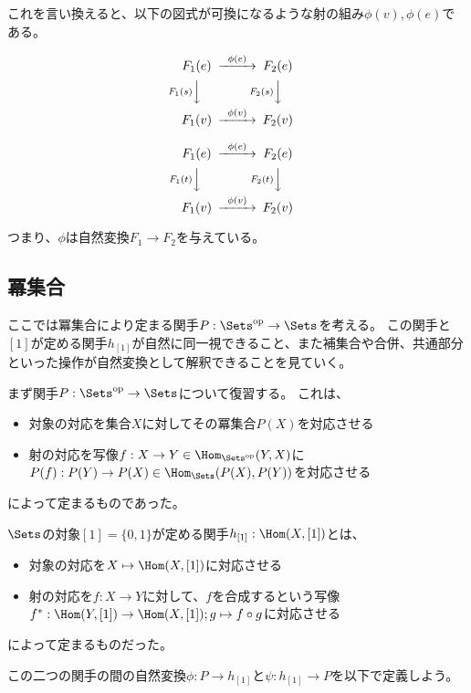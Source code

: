 \documentclass[uplatex]{jsarticle}
\begin{document}
これを言い換えると、以下の図式が可換になるような射の組み$\phi(v), \phi(e)$である。
\begin{multicols}{2}
\begin{align*}
\begin{CD}
F_1(e)@>\phi(e)>>F_2(e)\\
@VF_1(s)VV@VF_2(s)VV\\
F_1(v)@>\phi(v)>>F_2(v)
\end{CD}
\end{align*}

\begin{align*}
\begin{CD}
F_1(e)@>\phi(e)>>F_2(e)\\
@VF_1(t)VV@VF_2(t)VV\\
F_1(v)@>\phi(v)>>F_2(v)
\end{CD}
\end{align*}
\end{multicols}
つまり、$\phi$は自然変換$F_1 \to F_2$を与えている。

\subsection{冪集合}
ここでは冪集合により定まる関手$P:\Sets^{\rm op}\to\Sets$を考える。
この関手と$[1]$が定める関手$h_{[1]}$が自然に同一視できること、また補集合や合併、共通部分といった操作が自然変換として解釈できることを見ていく。

\vspace{10pt}

まず関手$P:\Sets^{\rm op}\to\Sets$について復習する。
これは、
\begin{itemize}
\item 対象の対応を集合$X$に対してその冪集合$P(X)$を対応させる
\item 射の対応を写像$f:X\to Y\in\Hom_{\Sets^{\rm op}}(Y,X)$に$P(f):P(Y)\to P(X)\in\Hom_{\Sets}(P(X),P(Y))$を対応させる
\end{itemize}
によって定まるものであった。

$\Sets$の対象$[1]=\{0,1\}$が定める関手$h_{[1]}:\Hom(X,[1])$とは、
\begin{itemize}
\item 対象の対応を$X \mapsto \Hom(X,[1])$に対応させる
\item 射の対応を$f:X \to Y$に対して、$f$を合成するという写像$f^*:\Hom(Y,[1]) \to \Hom(X,[1]);g \mapsto f\circ g$に対応させる
\end{itemize}
によって定まるものだった。

この二つの関手の間の自然変換$\phi:P \to h_{[1]}$と$\psi:h_{[1]} \to P$を以下で定義しよう。
\end{document}
